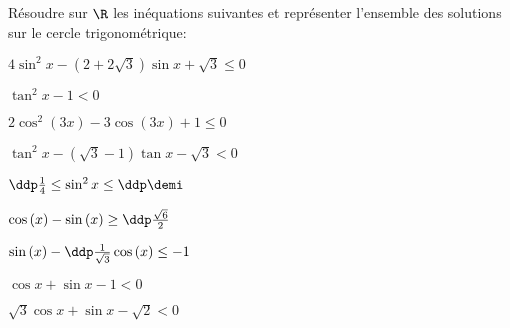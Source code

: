 
\begin{exercice}  \;
R\'esoudre sur $\R$ les in\'equations suivantes et repr\'esenter l'ensemble des solutions sur le cercle trigonom\'etrique:\\
\begin{enumerate}
\begin{minipage}[t]{0.45\textwidth}
\item $4\sin^2{x}-(2+2\sqrt{3})\sin{x}+\sqrt{3}\leq 0$
\item $\tan^2{x}-1<0$
\item $2\cos^2{(3x)}-3\cos{(3x)}+1\leq 0$   
\item $\tan^2{x}-(\sqrt{3}-1)\tan{x}-\sqrt{3}<0$
\item $\ddp\frac{1}{4}\leq \sin^2{x}\leq \ddp\demi$
\end{minipage}
\begin{minipage}[t]{0.45\textwidth}
\item $\cos{(x)}-\sin{(x)}\geq \ddp\frac{\sqrt{6}}{2}$  
\item $\sin{(x)}-\ddp\frac{1}{\sqrt{3}}\cos{(x)}\leq -1$
\item $\cos{x}+\sin{x}-1<0$
\item $\sqrt{3}\cos{x}+\sin{x}-\sqrt{2}<0$
\end{minipage}
\end{enumerate}
\end{exercice}